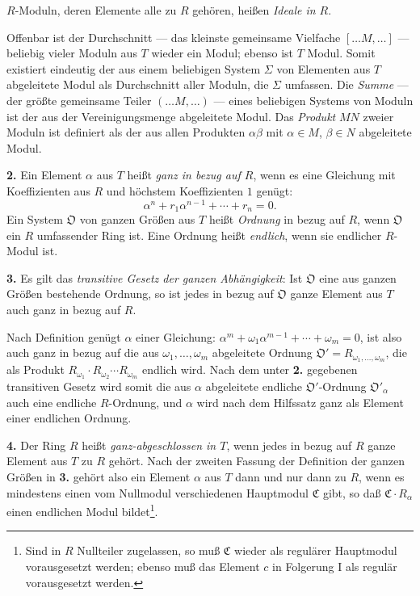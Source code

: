 \documentclass[12pt,a4paper]{article}
\newcommand{\fC}{\mathfrak{C}}
\newcommand{\fO}{\mathfrak{O}}
\theoremstyle{plain}
\theoremstyle{definition}
\theoremstyle{remark}
\begin{document}
$R$-Moduln, deren Elemente alle zu $R$ gehören, heißen \textit{Ideale in $R$}.

Offenbar ist der Durchschnitt --- das kleinste gemeinsame Vielfache $[\dots M,\dots]$ --- beliebig vieler Moduln aus $T$ wieder ein Modul; ebenso ist $T$ Modul. Somit existiert eindeutig der aus einem beliebigen System $\Sigma$ von Elementen aus $T$ abgeleitete Modul als Durchschnitt aller Moduln, die $\Sigma$ umfassen. Die \textit{Summe} --- der größte gemeinsame Teiler $(\dots M,\dots)$ --- eines beliebigen Systems von Moduln ist der aus der Vereinigungsmenge abgeleitete Modul. Das \textit{Produkt} $MN$ zweier Moduln ist definiert als der aus allen Produkten $\alpha\beta$ mit $\alpha \in M$, $\beta \in N$ abgeleitete Modul.

\medskip
\noindent
\textbf{2.} Ein Element $\alpha$ aus $T$ heißt \textit{ganz in bezug auf $R$}, wenn es eine Gleichung mit Koeffizienten aus $R$ und höchstem Koeffizienten $1$ genügt:
\[
\alpha^{n} + r_{1}\alpha^{n-1} + \cdots + r_{n} = 0.
\]
Ein System $\fO$ von ganzen Größen aus $T$ heißt \textit{Ordnung} in bezug auf $R$, wenn $\fO$ ein $R$ umfassender Ring ist. Eine Ordnung heißt \textit{endlich}, wenn sie endlicher $R$-Modul ist.

\medskip
\noindent
\textbf{3.} Es gilt das \textit{transitive Gesetz der ganzen Abhängigkeit}: Ist $\fO$ eine aus ganzen Größen bestehende Ordnung, so ist jedes in bezug auf $\fO$ ganze Element aus $T$ auch ganz in bezug auf $R$.

Nach Definition genügt $\alpha$ einer Gleichung: $\alpha^{m} + \omega_{1}\alpha^{m-1} + \cdots + \omega_{m} = 0$, ist also auch ganz in bezug auf die aus $\omega_{1},\dots,\omega_{m}$ abgeleitete Ordnung $\fO' = R_{\omega_{1},\dots,\omega_{m}}$, die als Produkt $R_{\omega_{1}} \cdot R_{\omega_{2}} \cdots R_{\omega_{m}}$ endlich wird. Nach dem unter \textbf{2.} gegebenen transitiven Gesetz wird somit die aus $\alpha$ abgeleitete endliche $\fO'$-Ordnung $\fO'_{\alpha}$ auch eine endliche $R$-Ordnung, und $\alpha$ wird nach dem Hilfssatz ganz als Element einer endlichen Ordnung.

\medskip
\noindent
\textbf{4.} Der Ring $R$ heißt \textit{ganz-abgeschlossen in $T$}, wenn jedes in bezug auf $R$ ganze Element aus $T$ zu $R$ gehört. Nach der zweiten Fassung der Definition der ganzen Größen in \textbf{3.} gehört also ein Element $\alpha$ aus $T$ dann und nur dann zu $R$, wenn es mindestens einen vom Nullmodul verschiedenen Hauptmodul $\fC$ gibt, so daß $\fC \cdot R_{\alpha}$ einen endlichen Modul bildet\footnote{Sind in $R$ Nullteiler zugelassen, so muß $\fC$ wieder als regulärer Hauptmodul vorausgesetzt werden; ebenso muß das Element $c$ in Folgerung I als regulär vorausgesetzt werden.}.
\end{document}
